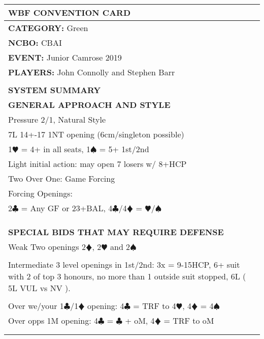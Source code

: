 \documentclass{article}
\newcommand\C{\ensuremath{\clubsuit}}
\newcommand\D{\color{red}\ensuremath{\vardiamondsuit}}
\renewcommand\H{\color{red}\ensuremath{\varheartsuit}}
\renewcommand\S{\ensuremath{\spadesuit}}
\newcommand\N{{\footnotesize NT}}
\begin{document}
\begin{minipage}{5mm}
	\begin{tabular}{| p{5mm} |}
	\end{tabular}
\end{minipage}
\begin{minipage}{90mm}
	\begin{tabular}{| p{88mm} |}
		\hline
		\cellcolor{green!25} \textbf{WBF CONVENTION CARD} \\ \hline
		\textbf{CATEGORY:} Green\\
		\textbf{NCBO:} CBAI \\
		\textbf{EVENT:} Junior Camrose 2019\\
		\textbf{PLAYERS:} John Connolly and Stephen Barr\\
		\multirow{2}{*}{} \\
		\\
		\hline \cellcolor{green!25} \textbf{SYSTEM SUMMARY} \\ \hline
		\cellcolor{orange!25}\textbf{GENERAL APPROACH AND STYLE} \\ \hline
		Pressure 2/1, Natural Style\\ \hline
		7L 14+-17 1{\N} opening (6cm/singleton possible)\\ \hline
		1{\H} = 4+ in all seats, 1{\S} = 5+ 1st/2nd\\ \hline
		Light initial action: may open 7 losers w/ 8+HCP\\ \hline
		Two Over One: Game Forcing\\ \hline
		Forcing Openings:\\ \hline
		{2\C} = Any GF or 23+BAL, 4{\C}/4{\D} = {\H}/{\S} \\ \hline
		\\ \hline
		\\ \hline
		\\ \hline
		\cellcolor{orange!25}\textbf{SPECIAL BIDS THAT MAY REQUIRE DEFENSE} \\ \hline
		Weak Two openings 2{\D}, 2{\H} and 2{\S}\\ \hline
		\\ \hline
		Intermediate 3 level openings in 1st/2nd: 
		3x = 9-15HCP, 6+ suit with 2 of top 3 honours,
		no more than 1 outside suit stopped, 6L ( 5L VUL vs NV ).\\ \hline
		\\ \hline
		Over we/your 1{\C}/1{\D} opening: 4{\C} = TRF to 4{\H}, 4{\D} = 4{\S} \\ \hline
		Over opps 1M opening: 4{\C} = {\C} + oM, 4{\D} = TRF to oM\\ \hline
		\\ \hline
		\\ \hline


\end{tabular}
\end{minipage}
\end{document}
